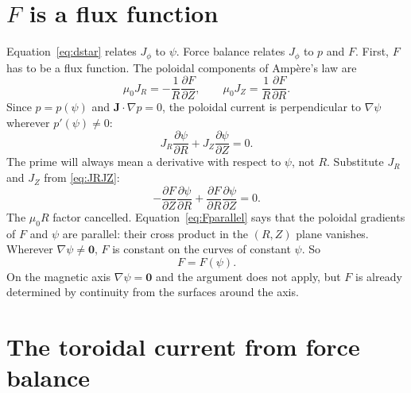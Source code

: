 \documentclass[11pt,a4paper,oneside,openany]{book}
\numberwithin{equation}{chapter}
\newcommand{\grad}{\nabla}
\theoremstyle{definition}
\begin{document}
\section{\texorpdfstring{\(F\)}{F} is a flux function}

Equation~\eqref{eq:dstar} relates \(J_{\phi}\) to \(\psi\). Force balance relates \(J_{\phi}\) to \(p\) and \(F\). First, \(F\) has to be a flux function. The poloidal components of Amp\`ere's law are
\begin{equation}
\label{eq:JRJZ}
\mu_{0} J_{R}=-\frac{1}{R}\frac{\partial F}{\partial Z},
\qquad
\mu_{0} J_{Z}=\frac{1}{R}\frac{\partial F}{\partial R}.
\end{equation}
Since \(p=p(\psi)\) and \(\mathbf{J}\cdot\grad p=0\), the poloidal current is perpendicular to \(\grad\psi\) wherever \(p'(\psi)\neq 0\):
\begin{equation}
\label{eq:Jpol}
J_{R}\frac{\partial\psi}{\partial R}+J_{Z}\frac{\partial\psi}{\partial Z}=0.
\end{equation}
The prime will always mean a derivative with respect to \(\psi\), not \(R\). Substitute \(J_{R}\) and \(J_{Z}\) from \eqref{eq:JRJZ}:
\begin{equation}
\label{eq:Fparallel}
-\frac{\partial F}{\partial Z}\frac{\partial\psi}{\partial R}
+\frac{\partial F}{\partial R}\frac{\partial\psi}{\partial Z}
=0.
\end{equation}
The \(\mu_{0} R\) factor cancelled. Equation~\eqref{eq:Fparallel} says that the poloidal gradients of \(F\) and \(\psi\) are parallel: their cross product in the \((R,Z)\) plane vanishes. Wherever \(\grad\psi\neq\mathbf{0}\), \(F\) is constant on the curves of constant \(\psi\). So
\begin{equation}
\label{eq:Fpsi}
F=F(\psi).
\end{equation}
On the magnetic axis \(\grad\psi=\mathbf{0}\) and the argument does not apply, but \(F\) is already determined by continuity from the surfaces around the axis.

\section{The toroidal current from force balance}
\end{document}
